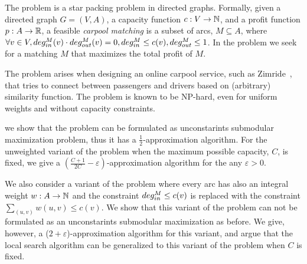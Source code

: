 The \textsc{\CARPOOL{}} problem is a star packing problem in directed graphs.
Formally, given a directed graph $G = (V, A)$,
a capacity function $c: V \rightarrow \N$,
and a profit function $p : A \rightarrow \R $,
a feasible \emph{carpool matching} is a subset of arcs, 
$M \subseteq A$, where
$\forall v \in V, 
\din[M](v) \cdot \dout[M](v) = 0, 
\din[M] \leq c(v),
\dout[M] \leq 1$. 
In the \textsc{\CARPOOL{}} problem we seek for a matching $M$
that maximizes the total profit of $M$.

The problem arises when designing an online carpool service, 
such as Zimride~\cite{zimride}, 
that tries to connect between passengers and drivers based on (arbitrary) similarity function.
The problem is known to be NP-hard, 
even for uniform weights and without capacity constraints.

we show that the problem can be formulated as
unconstarints submodular maximization problem, 
thus it has a $\frac{1}{2}$-approximation algorithm.
For the unweighted variant of the problem when the maximum possible capacity, $C$, is
fixed, we give a $(\frac{C + 1}{2C} - \varepsilon)$-approximation algorithm
for the any $\varepsilon > 0$.

We also consider a variant of the \textsc{\CARPOOL{}} problem where every arc
has also an integral weight $w:A \to \N$ and the constraint $\din[M] \leq c(v)$
is replaced with the constraint $\sum_{(u,v)}w(u,v) \leq c(v)$.
We show that this variant of the problem can not be formulated as an
unconstarints submodular maximization as before.
We give, however, a ($2 + \varepsilon$)-approximation algorithm for this
variant, and argue that the local search algorithm can be generalized to this
variant of the problem when $C$ is fixed.
